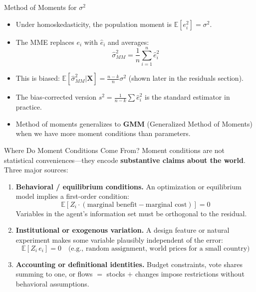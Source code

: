 \documentclass[aspectratio=169, handout]{beamer}
\numberwithin{equation}{section}
\begin{document}
\begin{frame}{Method of Moments for $\sigma^2$}
\begin{itemize}
\item Under homoskedasticity, the population moment is $\mathbb{E}[e_i^2]=\sigma^2$.\pause
\item The MME replaces $e_i$ with $\hat{e}_i$ and averages:
$$\hat{\sigma}^2_{MM}=\frac{1}{n}\sum_{i=1}^n\hat{e}_i^2$$\pause
\item This is biased: $\mathbb{E}[\hat{\sigma}^2_{MM}|\bm{X}]=\frac{n-k}{n}\sigma^2$ (shown later in the residuals section).\pause
\item The bias-corrected version $s^2=\frac{1}{n-k}\sum \hat{e}_i^2$ is the standard estimator in practice.
\item Method of moments generalizes to \textbf{GMM} (Generalized Method of Moments) when we have more moment conditions than parameters.
\end{itemize}
\end{frame}


\begin{frame}{Where Do Moment Conditions Come From?}
Moment conditions are not statistical conveniences---they encode \textbf{substantive claims about the world}.  Three major sources:\pause

\medskip
\begin{enumerate}
\item \textbf{Behavioral / equilibrium conditions.}  An optimization or equilibrium model implies a first-order condition:
$$\mathbb{E}[Z_i\cdot(\text{marginal benefit} - \text{marginal cost})]=0$$
Variables in the agent's information set must be orthogonal to the residual.\pause

\item \textbf{Institutional or exogenous variation.}  A design feature or natural experiment makes some variable plausibly independent of the error:
$$\mathbb{E}[Z_i\, e_i]=0 \quad\text{(e.g., random assignment, world prices for a small country)}$$\pause

\item \textbf{Accounting or definitional identities.}  Budget constraints, vote shares summing to one, or flows $=$ stocks $+$ changes impose restrictions without behavioral assumptions.
\end{enumerate}
\end{frame}
\end{document}
